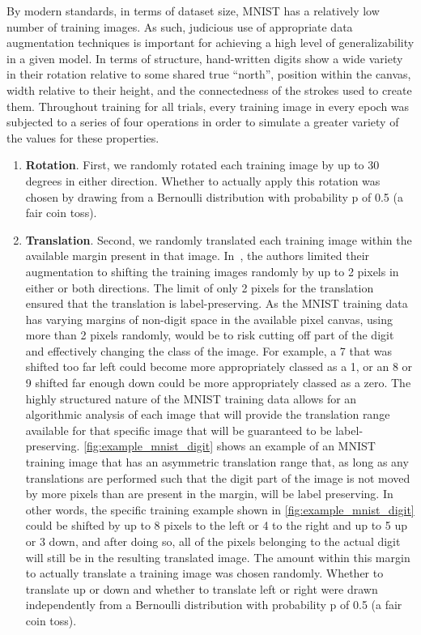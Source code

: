 \documentclass{article}
\newcommand{\rightparenthesis}{)}
\begin{document}
By modern standards, in terms of dataset size, MNIST has a relatively low number of training images.  As such, judicious use of appropriate data augmentation techniques is important for achieving a high level of generalizability in a given model.  In terms of structure, hand-written digits show a wide variety in their rotation relative to some shared true ``north'', position within the canvas, width relative to their height, and the connectedness of the strokes used to create them.  Throughout training for all trials, every training image in every epoch was subjected to a series of four operations in order to simulate a greater variety of the values for these properties.

\begin{enumerate}[label=\arabic*\rightparenthesis] \item \textbf{Rotation}.  First, we randomly rotated each training image by up to 30 degrees in either direction.  Whether to actually apply this rotation was chosen by drawing from a Bernoulli distribution with probability p of 0.5 (a fair coin toss).
\item \textbf{Translation}.  Second, we randomly translated each training image within the available margin present in that image.  In~\cite{Sabour2017}, the authors limited their augmentation to shifting the training images randomly by up to 2 pixels in either or both directions.  The limit of only 2 pixels for the translation ensured that the translation is label-preserving.  As the MNIST training data has varying margins of non-digit space in the available  pixel canvas, using more than 2 pixels randomly, would be to risk cutting off part of the digit and effectively changing the class of the image.  For example, a 7 that was shifted too far left could become more appropriately classed as a 1, or an 8 or 9 shifted far enough down could be more appropriately classed as a zero.  The highly structured nature of the MNIST training data allows for an algorithmic analysis of each image that will provide the translation range available for that specific image that will be guaranteed to be label-preserving.  \autoref{fig:example_mnist_digit} shows an example of an MNIST training image that has an asymmetric translation range that, as long as any translations are performed such that the digit part of the image is not moved by more pixels than are present in the margin, will be label preserving.  In other words, the specific training example shown in \autoref{fig:example_mnist_digit} could be shifted by up to 8 pixels to the left or 4 to the right and up to 5 up or 3 down, and after doing so, all of the pixels belonging to the actual digit will still be in the resulting translated image.  The amount within this margin to actually translate a training image was chosen randomly.  Whether to translate up or down and whether to translate left or right were drawn independently from a Bernoulli distribution with probability p of 0.5 (a fair coin toss).


\end{enumerate}
\end{document}
